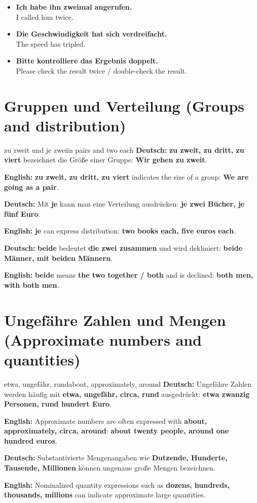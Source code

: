 \documentclass[a4paper,11pt]{article}
\newcommand{\GermanText}[1]{\textbf{Deutsch: }#1\par}
\newcommand{\EnglishText}[1]{{\small\color{SoftGray}\textbf{English: }#1\par}}
\newcommand{\ExampleItem}[2]{\item \textbf{#1}\\{\small\color{SoftGray}#2}}
\begin{document}
\begin{exbox}
\begin{itemize}
\ExampleItem{Ich habe ihn zweimal angerufen.}{I called him twice.}
\ExampleItem{Die Geschwindigkeit hat sich verdreifacht.}{The speed has tripled.}
\ExampleItem{Bitte kontrolliere das Ergebnis doppelt.}{Please check the result twice / double-check the result.}
\end{itemize}
\end{exbox}

\section{Gruppen und Verteilung \textnormal{(Groups and distribution)}}
\begin{grammarentry}{zu zweit und je zwei}{in pairs and two each}
\GermanText{\textbf{zu zweit, zu dritt, zu viert} bezeichnet die Größe einer Gruppe: \textbf{Wir gehen zu zweit}.}
\EnglishText{\textbf{zu zweit, zu dritt, zu viert} indicates the size of a group: \textbf{We are going as a pair}.}
\GermanText{Mit \textbf{je} kann man eine Verteilung ausdrücken: \textbf{je zwei Bücher, je fünf Euro}.}
\EnglishText{\textbf{je} can express distribution: \textbf{two books each, five euros each}.}
\GermanText{\textbf{beide} bedeutet \textbf{die zwei zusammen} und wird dekliniert: \textbf{beide Männer, mit beiden Männern}.}
\EnglishText{\textbf{beide} means \textbf{the two together / both} and is declined: \textbf{both men, with both men}.}
\end{grammarentry}

\section{Ungefähre Zahlen und Mengen \textnormal{(Approximate numbers and quantities)}}
\begin{grammarentry}{etwa, ungefähr, rund}{about, approximately, around}
\GermanText{Ungefähre Zahlen werden häufig mit \textbf{etwa, ungefähr, circa, rund} ausgedrückt: \textbf{etwa zwanzig Personen, rund hundert Euro}.}
\EnglishText{Approximate numbers are often expressed with \textbf{about, approximately, circa, around}: \textbf{about twenty people, around one hundred euros}.}
\GermanText{Substantivierte Mengenangaben wie \textbf{Dutzende, Hunderte, Tausende, Millionen} können ungenaue große Mengen bezeichnen.}
\EnglishText{Nominalized quantity expressions such as \textbf{dozens, hundreds, thousands, millions} can indicate approximate large quantities.}
\end{grammarentry}
\end{document}
